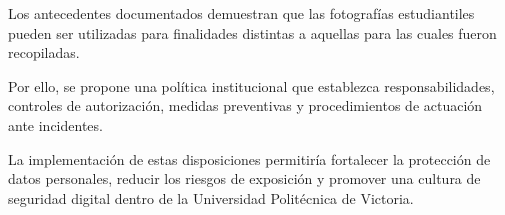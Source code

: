 \documentclass[12pt]{article}
\begin{document}
Los antecedentes documentados
demuestran que las fotografías
estudiantiles pueden ser
utilizadas para finalidades
distintas a aquellas para
las cuales fueron recopiladas.

Por ello, se propone una
política institucional que
establezca responsabilidades,
controles de autorización,
medidas preventivas y
procedimientos de actuación
ante incidentes.

La implementación de estas
disposiciones permitiría
fortalecer la protección
de datos personales,
reducir los riesgos
de exposición y promover
una cultura de seguridad
digital dentro de la
Universidad Politécnica
de Victoria.



\newpage

\printbibliography[
    heading=bibintoc,
    title={Referencias}
]
\end{document}
